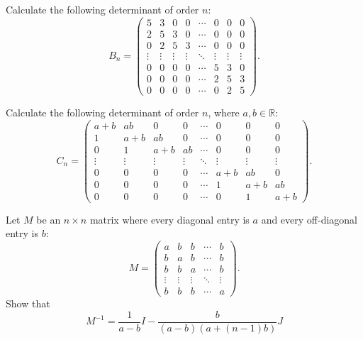 \documentclass[12pt]{article}
\begin{document}
\begin{problems}
\item Calculate the following determinant of order $n$:
\[
B_n=\begin{pmatrix}
5 & 3 & 0 & 0 & \cdots & 0 & 0 & 0\\
2 & 5 & 3 & 0 & \cdots & 0 & 0 & 0\\
0 & 2 & 5 & 3 & \cdots & 0 & 0 & 0\\
\vdots & \vdots & \vdots & \vdots & \ddots & \vdots & \vdots & \vdots\\
0 & 0 & 0 & 0 & \cdots & 5 & 3 & 0\\
0 & 0 & 0 & 0 & \cdots & 2 & 5 & 3\\
0 & 0 & 0 & 0 & \cdots & 0 & 2 & 5
\end{pmatrix}.
\]

\item Calculate the following determinant of order $n$, where $a,b\in\mathbb{R}$:
\[
C_n=\begin{pmatrix}
a+b & ab & 0 & 0 & \cdots & 0 & 0 & 0\\
1 & a+b & ab & 0 & \cdots & 0 & 0 & 0\\
0 & 1 & a+b & ab & \cdots & 0 & 0 & 0\\
\vdots & \vdots & \vdots & \vdots & \ddots & \vdots & \vdots & \vdots\\
0 & 0 & 0 & 0 & \cdots & a+b & ab & 0\\
0 & 0 & 0 & 0 & \cdots & 1 & a+b & ab\\
0 & 0 & 0 & 0 & \cdots & 0 & 1 & a+b
\end{pmatrix}.
\]

\item Let $M$ be an $n\times n$ matrix where every diagonal entry is $a$ and every off-diagonal entry is $b$:
\[
M=\begin{pmatrix}
a & b & b & \cdots & b\\
b & a & b & \cdots & b\\
b & b & a & \cdots & b\\
\vdots & \vdots & \vdots & \ddots & \vdots\\
b & b & b & \cdots & a
\end{pmatrix}.
\]
Show that
\[
M^{-1} = \frac{1}{a-b}I - \frac{b}{(a-b)(a+(n-1)b)}J
\]

\end{problems}
\end{document}
